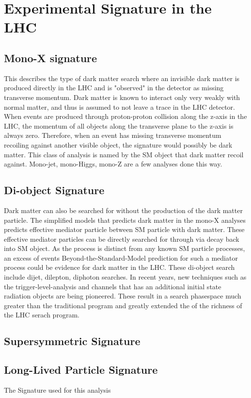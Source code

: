 \section{Experimental Signature in the LHC}
\label{section:signatures}

\subsection{Mono-X signature}
    This describes the type of dark matter search where an invisible dark matter is produced directly in the LHC and is "observed" in the detector as missing transverse momentum.
    Dark matter is known to interact only very weakly with normal matter, and thus is assumed to not leave a trace in the LHC detector. When events are produced through proton-proton collision along the z-axis in the LHC, the momentum of all objects along the transverse plane to the z-axis is always zero. Therefore, when an event has missing transverse momentum recoiling against another visible object, the signature would possibly be dark matter.
This class of analysis is named by the SM object that dark matter recoil against. Mono-jet, mono-Higgs, mono-Z are a few analyses done this way. 

\subsection{Di-object Signature}
    Dark matter can also be searched for without the production of the dark matter particle. The simplified models that predicts dark matter in the mono-X analyses predicts effective mediator particle between SM particle with dark matter. These effective mediator particles can be directly searched for through via decay back into SM object. As the process is distinct from any known SM particle processes, an excess of events Beyond-the-Standard-Model prediction for
    such a mediator process could be evidence for dark matter in the LHC. 
These di-object search include dijet, dilepton, diphoton searches. 
In recent years, new techniques such as the trigger-level-analysis and channels that has an additional initial state radiation objects are being pioneered. These result in a search phasespace much greater than the traditional program and greatly extended the of the richness of the LHC serach program.

\subsection{Supersymmetric Signature}	

\subsection{Long-Lived Particle Signature}


The Signature used for this analysis 
